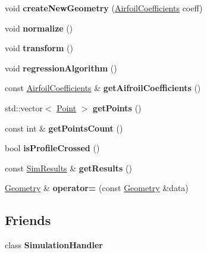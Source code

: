 \begin{DoxyCompactItemize}
void {\bfseries create\+New\+Geometry} (\hyperlink{struct_airfoil_coefficients}{Airfoil\+Coefficients} coeff)
\item 
\mbox{\label{class_geometry_a6e1d4e3c6c7d97768fef9761d870e1b7}} 
void {\bfseries normalize} ()
\item 
\mbox{\label{class_geometry_a4dbc5c3c0c2a3d7af940321bcb0dfdc5}} 
void {\bfseries transform} ()
\item 
\mbox{\label{class_geometry_a824e4bc80a6c08fd47d341fae8e67857}} 
void {\bfseries regression\+Algorithm} ()
\item 
\mbox{\label{class_geometry_a8db11be460efd0624647e031d6a388dc}} 
const \hyperlink{struct_airfoil_coefficients}{Airfoil\+Coefficients} \& {\bfseries get\+Aifroil\+Coefficients} ()
\item 
\mbox{\label{class_geometry_aabd6f360d9805824bda5e081720f7619}} 
std\+::vector$<$ \hyperlink{class_point}{Point} $>$ {\bfseries get\+Points} ()
\item 
\mbox{\label{class_geometry_a99a0a6e2dfb453eb224cc8f01e75b7b0}} 
const int \& {\bfseries get\+Points\+Count} ()
\item 
\mbox{\label{class_geometry_a354dfd9d846b58dbd3a1090ea4227e33}} 
bool {\bfseries is\+Profile\+Crossed} ()
\item 
\mbox{\label{class_geometry_a7aa3382a3f5b3436530c1348993ce129}} 
const \hyperlink{class_sim_results}{Sim\+Results} \& {\bfseries get\+Results} ()
\item 
\mbox{\label{class_geometry_aada258eedf595527f097faed460a5521}} 
\hyperlink{class_geometry}{Geometry} \& {\bfseries operator=} (const \hyperlink{class_geometry}{Geometry} \&data)
\end{DoxyCompactItemize}
\subsection*{Friends}
\begin{DoxyCompactItemize}
\item 
\mbox{\label{class_geometry_a88881bfc7b707b9bf91fd177fefa2e04}} 
class {\bfseries Simulation\+Handler}
\end{DoxyCompactItemize}


